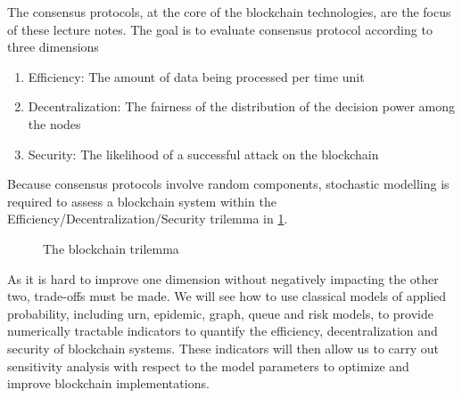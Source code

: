 The consensus protocols, at the core of the blockchain technologies, are the focus of these lecture notes. The goal is to evaluate consensus protocol according to three dimensions 
\begin{enumerate}
	\item Efficiency: The amount of data being processed per time unit
	\item Decentralization: The fairness of the distribution of the decision power among the nodes
	\item Security: The likelihood of a successful attack on the blockchain
\end{enumerate}
Because consensus protocols involve random components, stochastic modelling is required to assess a blockchain system within the Efficiency/Decentralization/Security trilemma in \cref{fig:blockchain_trilemma}. 
\begin{figure}[ht!]
\begin{center}
\end{center}
\caption{The blockchain trilemma}
\label{fig:blockchain_trilemma}
\end{figure}
As it is hard to improve one dimension without negatively impacting the other two, trade-offs must be made. We will see how to use classical models of applied probability, including urn, epidemic, graph, queue and risk models, to provide numerically tractable indicators to quantify the efficiency, decentralization and security of blockchain systems. These indicators will then allow us to carry out sensitivity analysis with respect to the model parameters to optimize and improve blockchain implementations.\\

